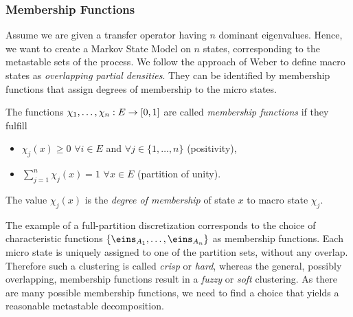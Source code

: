 \subsubsection*{Membership Functions}

Assume we are given a transfer operator having $n$ dominant eigenvalues. Hence, we want to create a Markov State Model on $n$ states, corresponding to the metastable sets of the process.
We follow the approach of Weber\cite{weber2006meshless} to define macro states as \textit{overlapping partial densities}.
They can be identified by membership functions that assign degrees of membership to the micro states.


\begin{defi}
The functions $\chi_1,\dots,\chi_n : E \rightarrow [0,1]$ are called \textit{membership functions} if they fulfill
\begin{itemize}
\item $\chi_j(x) \geq 0$ $\forall i \in E$ and $\forall j \in \{1,\dots,n\}$ (positivity),
\item $\sum_{j = 1}^n \chi_j(x) = 1$ $\forall x \in E$ (partition of unity).
\end{itemize}
The value $\chi_j(x)$ is the \textit{degree of membership} of state $x$ to macro state $\chi_j$.
\end{defi}

The example of a full-partition discretization corresponds to the choice of characteristic functions $\{ \eins_{A_1},\dots, \eins_{A_n} \}$ as membership functions. Each micro state is uniquely assigned to one of the partition sets, without any overlap.
Therefore such a clustering is called \textit{crisp} or \textit{hard}, whereas the general, possibly overlapping, membership functions result in a \textit{fuzzy} or \textit{soft} clustering.
As there are many possible membership functions, we need to find a choice that yields a reasonable metastable decomposition.


